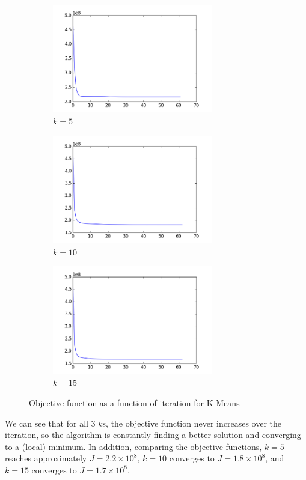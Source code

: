 \documentclass[11pt]{amsart}
\begin{document}
\begin{figure}[h]
	\centering
	\begin{subfigure}{0.5\textwidth}
		\includegraphics[width=7cm]{images/k5objectives.png}
		\caption{$k=5$}
	\end{subfigure}
	\begin{subfigure}{0.3\textwidth}
		\includegraphics[width=7cm]{images/k10objectives.png}
		\caption{$k=10$}
	\end{subfigure}
	\begin{subfigure}{0.3\textwidth}
		\includegraphics[width=7cm]{images/k15objectives.png}
		\caption{$k=15$}
	\end{subfigure}
	\caption{Objective function as a function of iteration for K-Means}
\end{figure}

We can see that for all 3 $k$s, the objective function never increases over the iteration, so the algorithm is constantly finding a better solution and converging to a (local) minimum. In addition, comparing the objective functions, $k=5$ reaches approximately $J=2.2\times 10^{8}$, $k=10$ converges to $J=1.8\times 10^{8}$, and $k=15$ converges to $J=1.7\times 10^{8}$.
\end{document}
